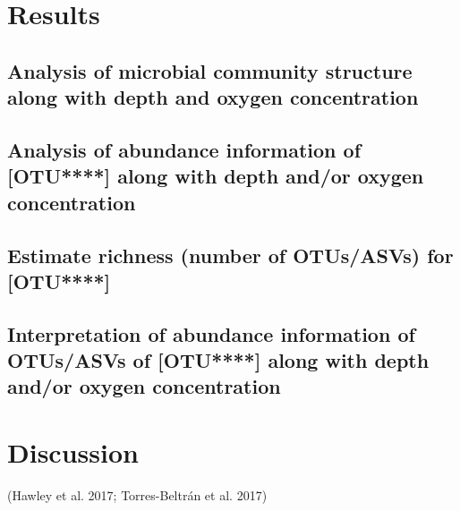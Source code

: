 \documentclass[11 pt,]{article}
\begin{document}
\section{Results}\label{results}

\subsection{\texorpdfstring{Analysis of microbial community structure
along with depth and oxygen concentration
\label{sec:community}}{Analysis of microbial community structure along with depth and oxygen concentration }}\label{analysis-of-microbial-community-structure-along-with-depth-and-oxygen-concentration}

\subsection{\texorpdfstring{Analysis of abundance information of
{[}OTU****{]} along with depth and/or oxygen concentration
\label{sec:OTUabundance}}{Analysis of abundance information of {[}OTU****{]} along with depth and/or oxygen concentration }}\label{analysis-of-abundance-information-of-otu-along-with-depth-andor-oxygen-concentration}

\subsection{\texorpdfstring{Estimate richness (number of OTUs/ASVs) for
{[}OTU****{]}
\label{sec:richness}}{Estimate richness (number of OTUs/ASVs) for {[}OTU****{]} }}\label{estimate-richness-number-of-otusasvs-for-otu}

\subsection{\texorpdfstring{Interpretation of abundance information of
OTUs/ASVs of {[}OTU****{]} along with depth and/or oxygen concentration
\label{sec:ASVabundances}}{Interpretation of abundance information of OTUs/ASVs of {[}OTU****{]} along with depth and/or oxygen concentration }}\label{interpretation-of-abundance-information-of-otusasvs-of-otu-along-with-depth-andor-oxygen-concentration}

\section{Discussion}\label{discussion}

(Hawley et al. 2017; Torres-Beltrán et al. 2017)
\end{document}
